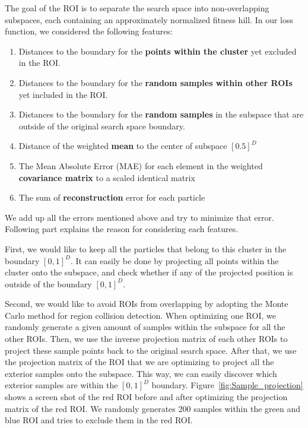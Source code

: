 The goal of the ROI is to separate the search space into non-overlapping subspaces, 
each containing an approximately normalized fitness hill.
In our loss function, we considered the following features:
\begin{enumerate}
    \item Distances to the boundary for the \textbf{points within the cluster} yet excluded in the ROI.
    \item Distances to the boundary for the \textbf{random samples within other ROIs} yet included in the ROI.
    \item Distances to the boundary for the \textbf{random samples} in the subspace that are outside of the original search space boundary.
    \item Distance of the weighted \textbf{mean} to the center of subspace $[0.5]^D$
    \item The Mean Absolute Error (MAE) for each element in the weighted \textbf{covariance matrix} to a scaled identical matrix
    \item The sum of \textbf{reconstruction} error for each particle 
\end{enumerate} 
We add up all the errors mentioned above and try to minimize that error. 
Following part explains the reason for considering each features.

First, we would like to keep all the particles that belong to this cluster in the boundary $[0,1]^D$.
It can easily be done by projecting all points within the cluster onto the subspace, 
and check whether if any of the projected position is outside of the boundary $[0,1]^D$.

Second, we would like to avoid ROIs from overlapping by adopting the Monte Carlo method for region collision detection. 
When optimizing one ROI, we randomly generate a given amount of samples within the subspace for all the other ROIs.
Then, we use the inverse projection matrix of each other ROIs to project these sample points back to the original search space.
After that, we use the projection matrix of the ROI that we are optimizing to project all the exterior samples onto the subspace.
This way, we can easily discover which exterior samples are within the $[0, 1]^D$ boundary.
Figure~\ref{fig:Sample_projection} shows a screen shot of the red ROI before and after optimizing the projection matrix of the red ROI.
We randomly generates 200 samples within the green and blue ROI and tries to exclude them in the red ROI.

